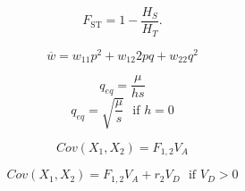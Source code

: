 \documentclass[12pt,twocolumn]{article}
\newcommand{\fst}{F_{\mathrm{ST}}}
\begin{document}
\begin{equation}
\fst =1-\frac{H_S}{H_T}.\nonumber
\end{equation}

\begin{equation}
\overline{w} = w_{11}p^2+w_{12}2pq+w_{22}q^2
\end{equation}

\begin{equation}
q_{eq} = \frac{\mu}{hs}
\end{equation}
\begin{equation}
q_{eq} =\sqrt{\frac{\mu}{s}}~~~\textrm{if } h=0
\end{equation}

\begin{equation}
Cov(X_1,X_2)  = F_{1,2} V_A 
\end{equation}

\begin{equation}
Cov(X_1,X_2)  = F_{1,2} V_A + r_2 V_D~~~\textrm{if } V_D>0
\end{equation}
\end{document}
